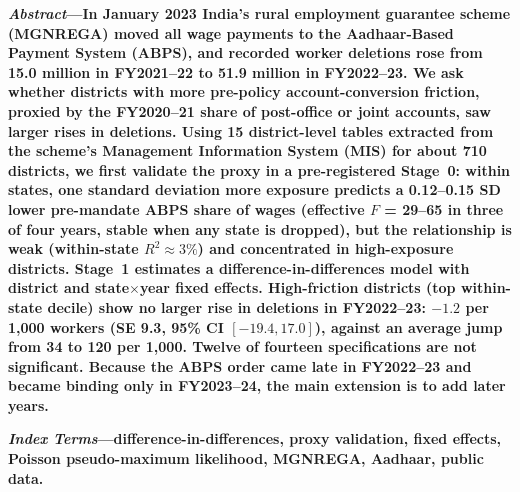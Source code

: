 \documentclass[10pt,twocolumn,letterpaper]{article}
\begin{document}

\noindent\textbf{\textit{Abstract}---In January 2023 India's rural employment guarantee scheme (MGNREGA) moved all wage payments to the Aadhaar-Based Payment System (ABPS), and recorded worker deletions rose from 15.0 million in FY2021--22 to 51.9 million in FY2022--23. We ask whether districts with more pre-policy account-conversion friction, proxied by the FY2020--21 share of post-office or joint accounts, saw larger rises in deletions. Using 15 district-level tables extracted from the scheme's Management Information System (MIS) for about 710 districts, we first validate the proxy in a pre-registered Stage~0: within states, one standard deviation more exposure predicts a 0.12--0.15 SD lower pre-mandate ABPS share of wages (effective $F$ = 29--65 in three of four years, stable when any state is dropped), but the relationship is weak (within-state $R^2 \approx 3\%$) and concentrated in high-exposure districts. Stage~1 estimates a difference-in-differences model with district and state$\times$year fixed effects. High-friction districts (top within-state decile) show no larger rise in deletions in FY2022--23: $-1.2$ per 1,000 workers (SE 9.3, 95\% CI $[-19.4, 17.0]$), against an average jump from 34 to 120 per 1,000. Twelve of fourteen specifications are not significant. Because the ABPS order came late in FY2022--23 and became binding only in FY2023--24, the main extension is to add later years.}

\vspace{4pt}
\noindent\textbf{\textit{Index Terms}---difference-in-differences, proxy validation, fixed effects, Poisson pseudo-maximum likelihood, MGNREGA, Aadhaar, public data.}
\end{document}
